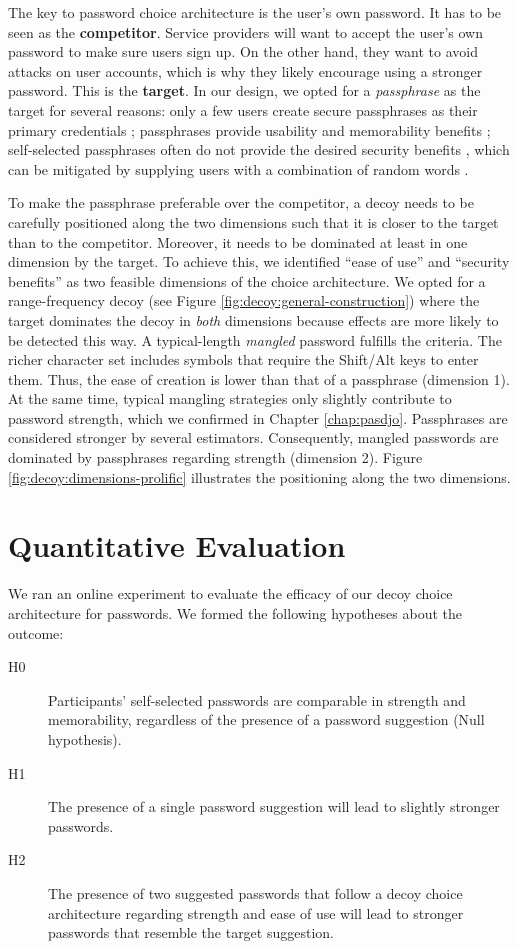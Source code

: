 The key to password choice architecture is the user's own password. It has to be seen as the \textbf{competitor}. Service providers will want to accept the user's own password to make sure users sign up. On the other hand, they want to avoid attacks on user accounts, which is why they likely encourage using a stronger password. This is the \textbf{target}. In our design, we opted for a \textit{passphrase} as the target for several reasons: only a few users create secure passphrases as their primary credentials \cite{Ur2015PWCreationLab}; passphrases provide usability and memorability benefits \cite{Keith2009PassphraseDesign}; self-selected passphrases often do not provide the desired security benefits \cite{Bonneau2012LinguisticProperties}, which can be mitigated by supplying users with a combination of random words \cite{Shay2012CorrectHorseBatteryStaple}. 

To make the passphrase preferable over the competitor, a decoy needs to be carefully positioned along the two dimensions such that it is closer to the target than to the competitor. Moreover, it needs to be dominated at least in one dimension by the target. To achieve this, we identified ``ease of use'' and ``security benefits'' as two feasible dimensions of the choice architecture. We opted for a range-frequency decoy (see Figure \ref{fig:decoy:general-construction}) where the target dominates the decoy in \textit{both} dimensions because effects are more likely to be detected this way. A typical-length \textit{mangled} password fulfills the criteria. The richer character set includes symbols that require the Shift/Alt keys to enter them. Thus, the ease of creation is lower than that of a passphrase (dimension 1). At the same time, typical mangling strategies only slightly contribute to password strength, which we confirmed in Chapter \ref{chap:pasdjo}. Passphrases are considered stronger by several estimators. Consequently, mangled passwords are dominated by passphrases regarding strength (dimension 2). Figure \ref{fig:decoy:dimensions-prolific} illustrates the positioning along the two dimensions.

\section{Quantitative Evaluation}
We ran an online experiment to evaluate the efficacy of our decoy choice architecture for passwords. We formed the following hypotheses about the outcome:
\begin{description}
	\item[H0] Participants' self-selected passwords are comparable in strength and memorability, regardless of the presence of a password suggestion (Null hypothesis). 
	\item[H1] The presence of a single password suggestion will lead to slightly stronger passwords.
	\item[H2] The presence of two suggested passwords that follow a decoy choice architecture regarding strength and ease of use will lead to stronger passwords that resemble the target suggestion. 
\end{description}

